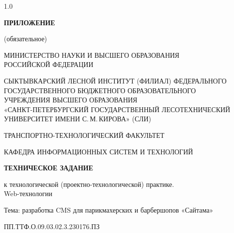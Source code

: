 \begin{titlepage}
\begin{spacing}{1.0}
\centering
\vspace*{-\baselineskip}

\ifdefined\tzappendixletter
    {\bfseries ПРИЛОЖЕНИЕ \tzappendixletter\par}
    (обязательное)\par
    \vspace{1.5\baselineskip}
\fi

МИНИСТЕРСТВО НАУКИ И ВЫСШЕГО ОБРАЗОВАНИЯ\\
РОССИЙСКОЙ ФЕДЕРАЦИИ

\vspace{\baselineskip}
СЫКТЫВКАРСКИЙ ЛЕСНОЙ ИНСТИТУТ (ФИЛИАЛ) ФЕДЕРАЛЬНОГО\\
ГОСУДАРСТВЕННОГО БЮДЖЕТНОГО ОБРАЗОВАТЕЛЬНОГО\\
УЧРЕЖДЕНИЯ ВЫСШЕГО ОБРАЗОВАНИЯ\\
«САНКТ-ПЕТЕРБУРГСКИЙ ГОСУДАРСТВЕННЫЙ ЛЕСОТЕХНИЧЕСКИЙ\\
УНИВЕРСИТЕТ ИМЕНИ С.\,М.\,КИРОВА» (СЛИ)

\vspace{\baselineskip}
ТРАНСПОРТНО-ТЕХНОЛОГИЧЕСКИЙ ФАКУЛЬТЕТ

\vspace{\baselineskip}
КАФЕДРА ИНФОРМАЦИОННЫХ СИСТЕМ И ТЕХНОЛОГИЙ

\vspace{2\baselineskip}
{\fontsize{14}{16}\selectfont\bfseries ТЕХНИЧЕСКОЕ ЗАДАНИЕ\par}

\vspace{\baselineskip}
к технологической (проектно-технологической) практике.\\
Web-технологии

\vspace{2\baselineskip}
\begin{small}
Тема: разработка CMS для парикмахерских и барбершопов «Сайтама»

\vspace{0.5\baselineskip}
ПП.ТТФ.О.09.03.02.3.230176.ПЗ


\end{small}
\end{spacing}
\end{titlepage}
